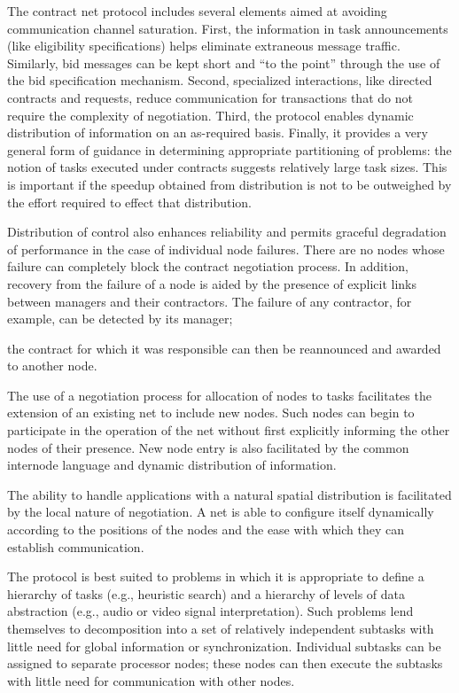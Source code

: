 \documentclass[
]{article}
\begin{document}
The contract net protocol includes several elements aimed at avoiding
communication channel saturation. First, the information in task
announcements (like eligibility specifications) helps eliminate
extraneous message traffic. Similarly, bid messages can be kept short
and ``to the point'' through the use of the bid specification mechanism.
Second, specialized interactions, like directed contracts and requests,
reduce communication for transactions that do not require the complexity
of negotiation. Third, the protocol enables dynamic distribution of
information on an as-required basis. Finally, it provides a very general
form of guidance in determining appropriate partitioning of problems:
the notion of tasks executed under contracts suggests relatively large
task sizes. This is important if the speedup obtained from distribution
is not to be outweighed by the effort required to effect that
distribution.

Distribution of control also enhances reliability and permits graceful
degradation of performance in the case of individual node failures.
There are no nodes whose failure can completely block the contract
negotiation process. In addition, recovery from the failure of a node is
aided by the presence of explicit links between managers and their
contractors. The failure of any contractor, for example, can be detected
by its manager;

the contract for which it was responsible can then be reannounced and
awarded to another node.

The use of a negotiation process for allocation of nodes to tasks
facilitates the extension of an existing net to include new nodes. Such
nodes can begin to participate in the operation of the net without first
explicitly informing the other nodes of their presence. New node entry
is also facilitated by the common internode language and dynamic
distribution of information.

The ability to handle applications with a natural spatial distribution
is facilitated by the local nature of negotiation. A net is able to
configure itself dynamically according to the positions of the nodes and
the ease with which they can establish communication.

The protocol is best suited to problems in which it is appropriate to
define a hierarchy of tasks (e.g., heuristic search) and a hierarchy of
levels of data abstraction (e.g., audio or video signal interpretation).
Such problems lend themselves to decomposition into a set of relatively
independent subtasks with little need for global information or
synchronization. Individual subtasks can be assigned to separate
processor nodes; these nodes can then execute the subtasks with little
need for communication with other nodes.
\end{document}
